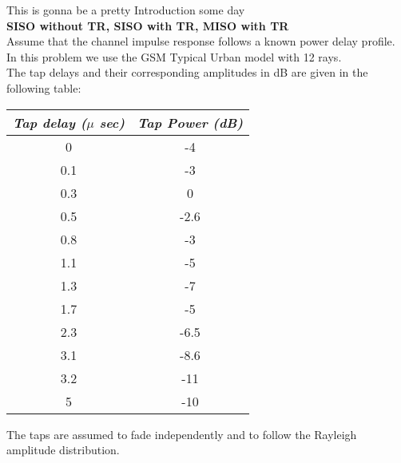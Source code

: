 This is gonna be a pretty Introduction some day\\
\textbf{SISO without TR, SISO with TR, MISO with TR}\\

Assume that the channel impulse response follows a known power delay profile. In this problem we use the GSM Typical Urban model with 12 rays.\\ The tap delays and their corresponding amplitudes in dB are given in the following table: 
\begin{center}
\begin{tabular}{c|c}
{\em Tap delay ($\mu$ sec)\/} & {\em Tap Power (dB)\/}  \\
\hline 0 & -4  \\
0.1 & -3 \\
0.3 & 0 \\
0.5 & -2.6\\
0.8 & -3\\
1.1 & -5\\
1.3 & -7\\
1.7 & -5\\
2.3 & -6.5\\
3.1 & -8.6\\
3.2 & -11\\
5 & -10
\end{tabular}
\end{center} 

The taps are assumed to fade independently and to follow the Rayleigh amplitude distribution. 